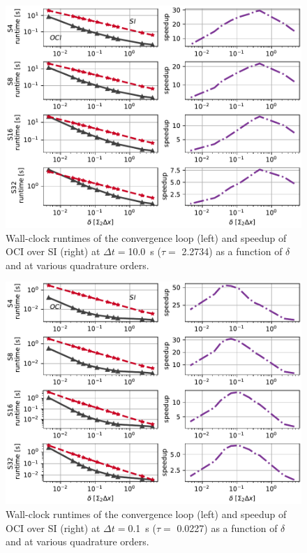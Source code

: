 \begin{figure}
    \centering
    \includegraphics[width=1.0\textwidth]{deterministic/therefore_paper/therefore_figs/runtimes_10.0.pdf}
    \caption{Wall-clock runtimes of the convergence loop (left) and 
    speedup of OCI over SI (right) at $\Delta t=$\SI{10.0}{\s} ($\tau=$ \num{2.2734}) as a function of $\delta$ and at various quadrature orders.}
    \label{fig:runtimes10.0}
\end{figure}

\begin{figure}
    \centering
    \includegraphics[width=1.0\textwidth]{deterministic/therefore_paper/therefore_figs/runtimes_0.1.pdf}
    \caption{Wall-clock runtimes of the convergence loop (left) and 
    speedup of OCI over SI (right) at $\Delta t=$\SI{0.1}{\s} ($\tau=$ \num{0.0227}) as a function of $\delta$ and at various quadrature orders.}
    \label{fig:runtimes0.1}
\end{figure}

